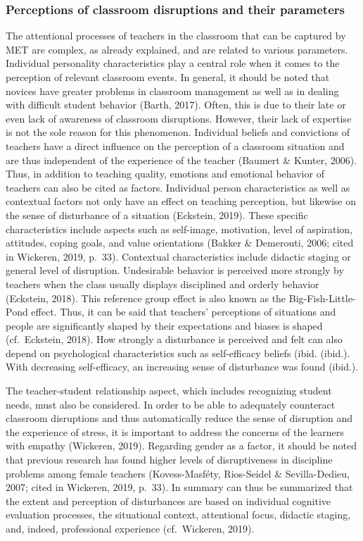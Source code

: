 \documentclass[
  man]{apa6}
\begin{document}
\hypertarget{perceptions-of-classroom-disruptions-and-their-parameters}{%
\subsubsection{Perceptions of classroom disruptions and their parameters}\label{perceptions-of-classroom-disruptions-and-their-parameters}}

The attentional processes of teachers in the classroom that can be captured by MET are complex, as already explained, and are related to various parameters. Individual personality characteristics play a central role when it comes to the perception of relevant classroom events. In general, it should be noted that novices have greater problems in classroom management as well as in dealing with difficult student behavior (Barth, 2017). Often, this is due to their late or even lack of awareness of classroom disruptions. However, their lack of expertise is not the sole reason for this phenomenon. Individual beliefs and convictions of teachers have a direct influence on the perception of a classroom situation and are thus independent of the experience of the teacher (Baumert \& Kunter, 2006). Thus, in addition to teaching quality, emotions and emotional behavior of teachers can also be cited as factors. Individual person characteristics as well as contextual factors not only have an effect on teaching perception, but likewise on the sense of disturbance of a situation (Eckstein, 2019). These specific characteristics include aspects such as self-image, motivation, level of aspiration, attitudes, coping goals, and value orientations (Bakker \& Demerouti, 2006; cited in Wickeren, 2019, p.~33). Contextual characteristics include didactic staging or general level of disruption. Undesirable behavior is perceived more strongly by teachers when the class usually displays disciplined and orderly behavior (Eckstein, 2018). This reference group effect is also known as the Big-Fish-Little-Pond effect. Thus, it can be said that teachers' perceptions of situations and people are significantly shaped by their expectations and biases is shaped (cf.~Eckstein, 2018). How strongly a disturbance is perceived and felt can also depend on psychological characteristics such as self-efficacy beliefs (ibid. (ibid.). With decreasing self-efficacy, an increasing sense of disturbance was found (ibid.).

The teacher-student relationship aspect, which includes recognizing student needs, must also be considered. In order to be able to adequately counteract classroom disruptions and thus automatically reduce the sense of disruption and the experience of stress, it is important to address the concerns of the learners with empathy (Wickeren, 2019). Regarding gender as a factor, it should be noted that previous research has found higher levels of disruptiveness in discipline problems among female teachers (Kovess-Masféty, Rios-Seidel \& Sevilla-Dedieu, 2007; cited in Wickeren, 2019, p.~33). In summary can thus be summarized that the extent and perception of disturbances are based on individual cognitive evaluation processes, the situational context, attentional focus, didactic staging, and, indeed, professional experience (cf.~Wickeren, 2019).
\end{document}
